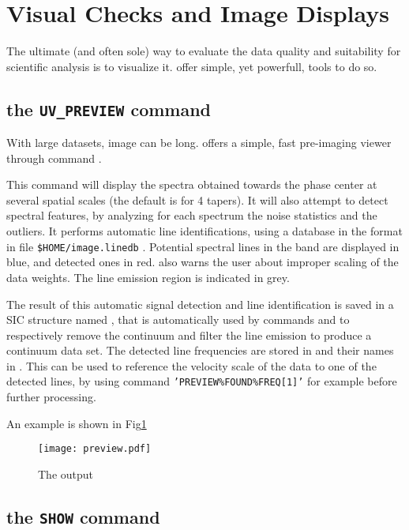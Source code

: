 \section{Visual Checks and Image Displays}

The ultimate (and often sole) way to evaluate the data quality
and suitability for scientific analysis is to visualize it.
\imager{} offer simple, yet powerfull, tools to do so.

\subsection{the \texttt{UV\_PREVIEW} command}
With large datasets, image can be long. \imager{} offers a
simple, fast pre-imaging viewer through command .

This command will display the spectra obtained towards the
phase center at several spatial scales (the default is for 4 tapers).
It will also attempt to detect spectral features, by analyzing for
each spectrum the noise statistics and the outliers. It performs
automatic line identifications, using a database in the 
format in file \texttt{\$HOME/image.linedb} .
Potential spectral lines in the band are displayed in blue, and
detected ones in red.
 also warns the user about improper scaling
of the data weights.
The line emission region is indicated in grey.

The result of this automatic signal detection and line identification
is saved in a SIC structure named , that is 
automatically used by commands  and
 to respectively remove the continuum and
filter the line emission to produce a continuum data set. 
The detected line frequencies are stored in
  and their names in
. This can be used to reference
the velocity scale of the data to one of the detected lines, by
using command \texttt{'PREVIEW\%FOUND\%FREQ[1]'} 
for example before further processing.

An example is shown in Fig\ref{fig:preview}
\begin{figure}
  \centering
  \texttt{[image: preview.pdf]}
  \caption{The  output
\label{fig:preview}}
\end{figure}


\subsection{the \texttt{SHOW} command}

